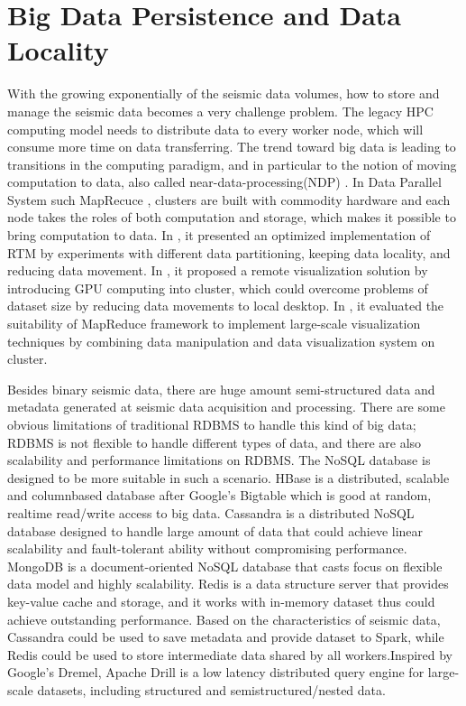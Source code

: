 \section{Big Data Persistence and Data Locality}
With the growing exponentially of the seismic data volumes, how to store and manage the seismic data becomes a very challenge problem. The legacy HPC computing model needs to distribute data to every worker node, which will consume more time on data transferring. The trend toward big data is leading to transitions in the computing paradigm, and in particular to the notion of moving computation to data, also called near-data-processing(NDP) \cite{6871738BalasubramonianNDP}. In Data Parallel System such MapRecuce \cite{6217449GuoDataLocalityMapReduce}, clusters are built with commodity hardware and each node takes the roles of both computation and storage, which makes it possible to bring computation to data. In \cite{6267846PerroneReducingDataMovement}, it presented an optimized implementation of RTM by experiments with different data partitioning, keeping data locality, and reducing data movement. In \cite{NextDataCenterVisualization}, it proposed a remote visualization solution by introducing GPU computing into cluster, which could overcome problems of dataset size by reducing data movements to local desktop. In \cite{6092321VoParaVisMapReduce}, it evaluated the suitability of MapReduce framework to implement large-scale visualization techniques by combining data manipulation and data visualization system on cluster. 

Besides  binary seismic data, there are huge amount semi-structured data and metadata generated at seismic data acquisition and processing. There are some obvious limitations of traditional RDBMS to handle this kind of big data; RDBMS is not flexible to handle different types of data, and there are also scalability and performance limitations on RDBMS. The NoSQL database is designed to be more suitable in such a scenario. HBase \cite{ApacheHBase} is a distributed, scalable and column\-based database after Google's Bigtable \cite{BigTableChang1365816} which is good at random, realtime read/write access to big data. Cassandra \cite{ApacheCassandra} is a distributed NoSQL database designed to handle large amount of data that could achieve linear scalability and fault-tolerant ability without compromising performance. MongoDB \cite{MongoDBNoSQL} is a document-oriented NoSQL database that casts focus on flexible data model and highly scalability. Redis \cite{RedisNoSQL} is a data structure server that provides key-value cache and storage, and it works with in-memory dataset thus could achieve outstanding performance. Based on the characteristics of seismic data, Cassandra could be used to save metadata and provide dataset to Spark, while Redis could be used to store intermediate data shared by all workers.Inspired by Google’s Dremel, Apache Drill \cite{ApacheDrillMain} is a low latency distributed query engine for large-scale datasets, including structured and semi\-structured/nested data. 


